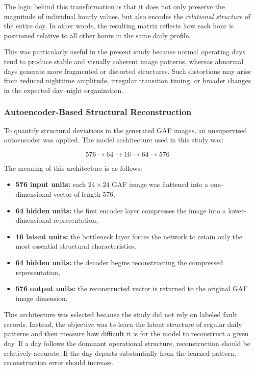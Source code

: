 \documentclass{article}
\begin{document}
The logic behind this transformation is that it does not only preserve the magnitude of individual hourly values, but also encodes the \emph{relational structure} of the entire day. In other words, the resulting matrix reflects how each hour is positioned relative to all other hours in the same daily profile.

This was particularly useful in the present study because normal operating days tend to produce stable and visually coherent image patterns, whereas abnormal days generate more fragmented or distorted structures. Such distortions may arise from reduced nighttime amplitude, irregular transition timing, or broader changes in the expected day--night organization.

\subsubsection{Autoencoder-Based Structural Reconstruction}

To quantify structural deviations in the generated GAF images, an unsupervised autoencoder was applied. The model architecture used in this study was:

\[
576 \rightarrow 64 \rightarrow 16 \rightarrow 64 \rightarrow 576
\]

The meaning of this architecture is as follows:

\begin{itemize}
    \item \textbf{576 input units:} each $24 \times 24$ GAF image was flattened into a one-dimensional vector of length $576$,
    \item \textbf{64 hidden units:} the first encoder layer compresses the image into a lower-dimensional representation,
    \item \textbf{16 latent units:} the bottleneck layer forces the network to retain only the most essential structural characteristics,
    \item \textbf{64 hidden units:} the decoder begins reconstructing the compressed representation,
    \item \textbf{576 output units:} the reconstructed vector is returned to the original GAF image dimension.
\end{itemize}

This architecture was selected because the study did not rely on labeled fault records. Instead, the objective was to learn the latent structure of regular daily patterns and then measure how difficult it is for the model to reconstruct a given day. If a day follows the dominant operational structure, reconstruction should be relatively accurate. If the day departs substantially from the learned pattern, reconstruction error should increase.
\end{document}
